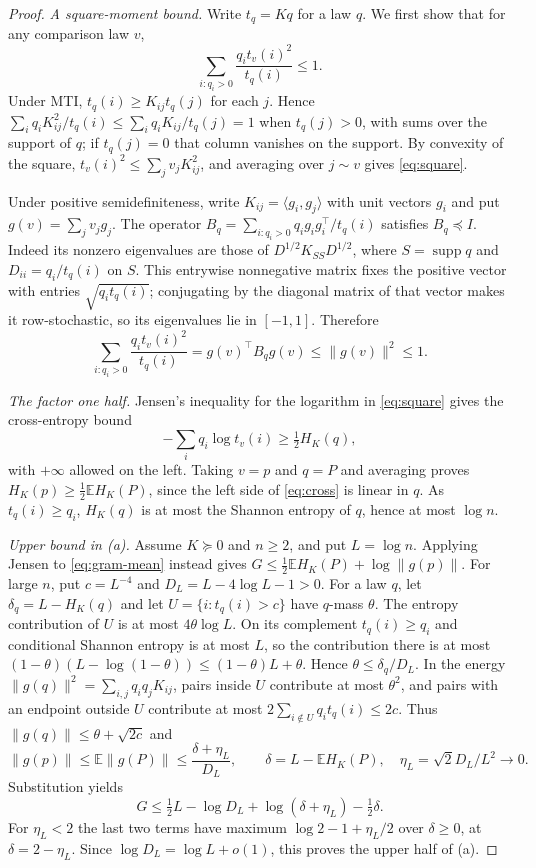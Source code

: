 \documentclass[11pt,a4paper]{article}
\theoremstyle{remark}
\begin{document}
\begin{proof}
\emph{A square-moment bound.} Write $t_q=Kq$ for a law $q$. We first show that for any comparison law $v$,
\begin{equation}\label{eq:square}
 \sum_{i:q_i>0}\frac{q_i t_v(i)^2}{t_q(i)}\le1.
\end{equation}
Under MTI, $t_q(i)\ge K_{ij}t_q(j)$ for each $j$. Hence $\sum_i q_i K_{ij}^2/t_q(i)\le\sum_i q_i K_{ij}/t_q(j)=1$ when $t_q(j)>0$, with sums over the support of $q$; if $t_q(j)=0$ that column vanishes on the support. By convexity of the square, $t_v(i)^2\le\sum_jv_jK_{ij}^2$, and averaging over $j\sim v$ gives \eqref{eq:square}.

Under positive semidefiniteness, write $K_{ij}=\langle g_i,g_j\rangle$ with unit vectors $g_i$ and put $g(v)=\sum_j v_jg_j$. The operator $B_q=\sum_{i:q_i>0} q_i g_i g_i^\top/t_q(i)$ satisfies $B_q\preceq I$. Indeed its nonzero eigenvalues are those of $D^{1/2}K_{SS}D^{1/2}$, where $S=\operatorname{supp}q$ and $D_{ii}=q_i/t_q(i)$ on $S$. This entrywise nonnegative matrix fixes the positive vector with entries $\sqrt{q_it_q(i)}$; conjugating by the diagonal matrix of that vector makes it row-stochastic, so its eigenvalues lie in $[-1,1]$. Therefore
\begin{equation}\label{eq:gram-mean}
 \sum_{i:q_i>0}\frac{q_i t_v(i)^2}{t_q(i)}
 =g(v)^\top B_q g(v)\le\|g(v)\|^2\le1 .
\end{equation}

\emph{The factor one half.} Jensen's inequality for the logarithm in \eqref{eq:square} gives the cross-entropy bound
\begin{equation}\label{eq:cross}
 -\sum_i q_i\log t_v(i)\ge\tfrac12 H_K(q),
\end{equation}
with $+\infty$ allowed on the left. Taking $v=p$ and $q=P$ and averaging proves $H_K(p)\ge\frac12\mathbb EH_K(P)$, since the left side of \eqref{eq:cross} is linear in $q$. As $t_q(i)\ge q_i$, $H_K(q)$ is at most the Shannon entropy of $q$, hence at most $\log n$.

\emph{Upper bound in (a).} Assume $K\succeq0$ and $n\ge2$, and put $L=\log n$. Applying Jensen to \eqref{eq:gram-mean} instead gives $G\le \tfrac12\mathbb E H_K(P)+\log\|g(p)\|$. For large $n$, put $c=L^{-4}$ and $D_L=L-4\log L-1>0$. For a law $q$, let $\delta_q=L-H_K(q)$ and let $U=\{i:t_q(i)>c\}$ have $q$-mass $\theta$. The entropy contribution of $U$ is at most $4\theta\log L$. On its complement $t_q(i)\ge q_i$ and conditional Shannon entropy is at most $L$, so the contribution there is at most $(1-\theta)(L-\log(1-\theta))\le(1-\theta)L+\theta$. Hence $\theta\le\delta_q/D_L$. In the energy $\|g(q)\|^2=\sum_{i,j}q_iq_jK_{ij}$, pairs inside $U$ contribute at most $\theta^2$, and pairs with an endpoint outside $U$ contribute at most $2\sum_{i\notin U}q_it_q(i)\le2c$. Thus $\|g(q)\|\le\theta+\sqrt{2c}$ and
\[
 \|g(p)\|\le\mathbb E\|g(P)\|
 \le\frac{\delta+\eta_L}{D_L},
 \qquad \delta=L-\mathbb{E}H_K(P),\quad
 \eta_L=\sqrt2 D_L/L^2\to0.
\]
Substitution yields
\[
 G\le\tfrac12 L-\log D_L+\log(\delta+\eta_L)-\tfrac12\delta.
\]
For $\eta_L<2$ the last two terms have maximum $\log 2-1+\eta_L/2$ over $\delta\ge0$, at $\delta=2-\eta_L$. Since $\log D_L=\log L+o(1)$, this proves the upper half of (a).


\end{proof}
\end{document}
